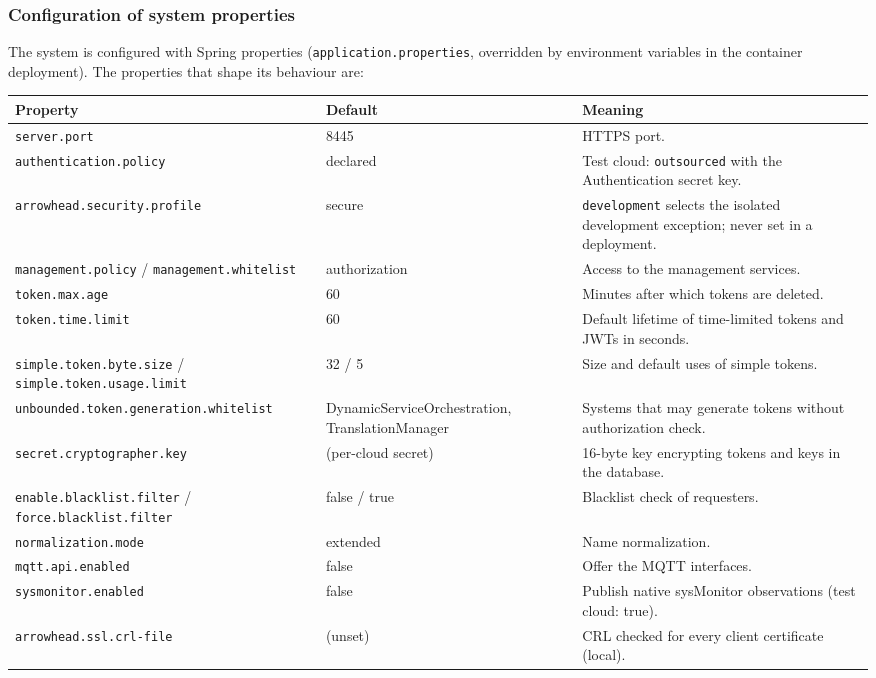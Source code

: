 \documentclass[a4paper]{arrowhead}
\begin{document}
\subsubsection{Configuration of system properties}

The system is configured with Spring properties (\texttt{application.properties}, overridden by environment variables in the container deployment). The properties that shape its behaviour are:

\noindent\begin{longtable}{| p{5.4cm} | p{3.4cm} | p{6.4cm} |} \hline
\rowcolor{gray!33} Property & Default & Meaning \\ \hline \endhead
\texttt{server.\allowbreak{}port} & 8445 & HTTPS port. \\ \hline
\texttt{authentication.\allowbreak{}policy} & declared & Test cloud: \texttt{outsourced} with the Authentication secret key. \\ \hline
\texttt{arrowhead.\allowbreak{}security.\allowbreak{}profile} & secure & \texttt{development} selects the isolated development exception; never set in a deployment. \\ \hline
\texttt{management.\allowbreak{}policy} / \texttt{management.\allowbreak{}whitelist} & authorization & Access to the management services. \\ \hline
\texttt{token.\allowbreak{}max.\allowbreak{}age} & 60 & Minutes after which tokens are deleted. \\ \hline
\texttt{token.\allowbreak{}time.\allowbreak{}limit} & 60 & Default lifetime of time-limited tokens and JWTs in seconds. \\ \hline
\texttt{simple.\allowbreak{}token.\allowbreak{}byte.\allowbreak{}size} / \texttt{simple.\allowbreak{}token.\allowbreak{}usage.\allowbreak{}limit} & 32 / 5 & Size and default uses of simple tokens. \\ \hline
\texttt{unbounded.\allowbreak{}token.\allowbreak{}generation.\allowbreak{}whitelist} & Dynamic\allowbreak{}Service\allowbreak{}Orchestration, Translation\allowbreak{}Manager & Systems that may generate tokens without authorization check. \\ \hline
\texttt{secret.\allowbreak{}cryptographer.\allowbreak{}key} & (per-cloud secret) & 16-byte key encrypting tokens and keys in the database. \\ \hline
\texttt{enable.\allowbreak{}blacklist.\allowbreak{}filter} / \texttt{force.\allowbreak{}blacklist.\allowbreak{}filter} & false / true & Blacklist check of requesters. \\ \hline
\texttt{normalization.\allowbreak{}mode} & extended & Name normalization. \\ \hline
\texttt{mqtt.\allowbreak{}api.\allowbreak{}enabled} & false & Offer the MQTT interfaces. \\ \hline
\texttt{sysmonitor.\allowbreak{}enabled} & false & Publish native sysMonitor observations (test cloud: true). \\ \hline
\texttt{arrowhead.\allowbreak{}ssl.\allowbreak{}crl-\allowbreak{}file} & (unset) & CRL checked for every client certificate (local). \\ \hline
\end{longtable}
\end{document}
